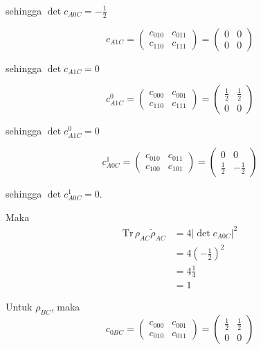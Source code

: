 \begin{enumerate}
	sehingga $\det c_{A0C} = -\frac{1}{2}$
	
	\begin{equation}
		c_{A1C}=
		\begin{pmatrix}
			c_{010} & c_{011} \\
			c_{110} & c_{111}
		\end{pmatrix}=
		\begin{pmatrix}
			0 & 0 \\
			0 & 0
		\end{pmatrix}
	\end{equation}
	
	sehingga $\det c_{A1C} = 0$
	
	\begin{equation}
		c_{A1C}^0=
		\begin{pmatrix}
			c_{000} & c_{001} \\
			c_{110} & c_{111}
		\end{pmatrix}=
		\begin{pmatrix}
			\frac{1}{2} & \frac{1}{2} \\
			0 & 0
		\end{pmatrix}
	\end{equation}
	
	sehingga $\det c_{A1C}^0 = 0$
	
	\begin{equation}
		c_{A0C}^1=
		\begin{pmatrix}
			c_{010} & c_{011} \\
			c_{100} & c_{101}
		\end{pmatrix}=
		\begin{pmatrix}
			0 & 0 \\
			\frac{1}{2} & -\frac{1}{2}
		\end{pmatrix}
	\end{equation}
	
	sehingga $\det c_{A0C}^1 = 0$.
	
	Maka
	\begin{equation}
		\begin{aligned}
			\mathrm{Tr}\,\rho_{AC}\tilde{\rho}_{AC}
			&=4|\det c_{A0C}|^2\\
			&=4(-\frac{1}{2})^2\\
			&=4\frac{1}{4}\\
			&=1
		\end{aligned}
	\end{equation}
	
	Untuk $\rho_{BC}$, maka
	\begin{equation}
		c_{0BC}=
		\begin{pmatrix}
			c_{000} & c_{001} \\
			c_{010} & c_{011}
		\end{pmatrix}=
		\begin{pmatrix}
			\frac{1}{2} & \frac{1}{2} \\
			0 & 0
		\end{pmatrix}
	\end{equation}
	

\end{enumerate}
